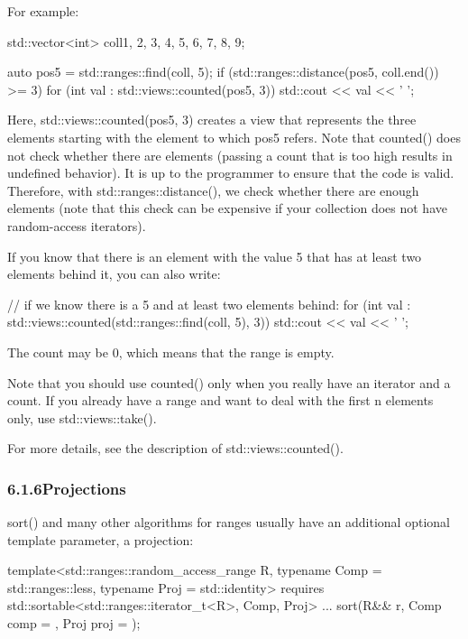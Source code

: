 For example:

\begin{cpp}
std::vector<int> coll{1, 2, 3, 4, 5, 6, 7, 8, 9};

auto pos5 = std::ranges::find(coll, 5);
if (std::ranges::distance(pos5, coll.end()) >= 3) {
	for (int val : std::views::counted(pos5, 3)) {
		std::cout << val << ' ';
	}
}
\end{cpp}

Here, std::views::counted(pos5, 3) creates a view that represents the three elements starting with the element to which pos5 refers. Note that counted() does not check whether there are elements (passing a count that is too high results in undefined behavior). It is up to the programmer to ensure that the code is valid. Therefore, with std::ranges::distance(), we check whether there are enough elements (note that this check can be expensive if your collection does not have random-access iterators).

If you know that there is an element with the value 5 that has at least two elements behind it, you can also write:

\begin{cpp}
// if we know there is a 5 and at least two elements behind:
for (int val : std::views::counted(std::ranges::find(coll, 5), 3)) {
	std::cout << val << ' ';
}
\end{cpp}

The count may be 0, which means that the range is empty.

Note that you should use counted() only when you really have an iterator and a count. If you already have a range and want to deal with the first n elements only, use std::views::take().

For more details, see the description of std::views::counted().

\subsubsection*{ 6.1.6\hspace{0.2cm}Projections}

sort() and many other algorithms for ranges usually have an additional optional template parameter, a projection:

\begin{cpp}
template<std::ranges::random_access_range R,
			typename Comp = std::ranges::less,
			typename Proj = std::identity>
requires std::sortable<std::ranges::iterator_t<R>, Comp, Proj>
... sort(R&& r, Comp comp = {}, Proj proj = {});
\end{cpp}

